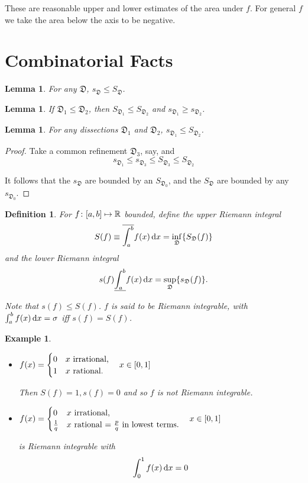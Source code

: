 \documentclass{notes}
\theoremstyle{plain}
\newtheorem{definition}[proposition]{Definition}
\newtheorem{example}[proposition]{Example}
\newtheorem{lemma}[proposition]{Lemma}
\newcommand{\dis}{\mathfrak{D}}
\begin{document}
These are reasonable upper and lower estimates of the area under $ f $.
For general $ f $ we take the area below the axis to be negative.

\section*{Combinatorial Facts}

\begin{lemma}
For any $ \dis $, $ s_{\dis}\leq S_{\dis} $.
\end{lemma}

\begin{lemma}
If $ \dis_{1}\leq \dis_{2} $, then $ S_{\dis_{1}}\leq S_{\dis_{2}} 
$ and $ s_{\dis_{1}}\geq s_{\dis_{2}} $.
\end{lemma}

\begin{lemma}
For any dissections $ \dis_{1} $ and $ \dis_{2} $, $ 
s_{\dis_{1}}\leq S_{\dis_{2}} $.
\end{lemma}
\begin{proof}
Take a common refinement $ \dis_{3} $, say, and
\[ s_{\dis_{1}}\leq s_{\dis_{3}} \leq S_{\dis_{3}} \leq S_{\dis_{2}} \]

It follows that the $ s_{\dis} $ are bounded by an $ S_{\dis_{0}} 
$, and the $ S_{\dis} $ are bounded by any $ s_{\dis_{0}} $.
\end{proof}

\begin{definition}
For $ f\colon [a,b] \mapsto \mathbb{R} $ bounded, define the upper Riemann integral
\[
S(f) \equiv \overline{\int_{a}^{b}}f(x)\,\ud x = 
\inf_{\dis}\{S_{\dis}(f)\}
\]
and the lower Riemann integral
\[
s(f) \underline{\int_{a}^{b}}f(x)\,\ud x = 
\sup_{\dis}\{s_{\dis}(f)\}.
\]

Note that $ s(f)\leq S(f) $.  $ f $ is said to be \emph{Riemann
  integrable}, with $ \int_{a}^{b}f(x)\,\mathrm{d} x = \sigma $  iff $s(f) =
  S(f)$.
\end{definition}

\begin{example}
\

\begin{itemize}
\item $ f(x)=
\begin{cases} 0& \text{$ x $ irrational,} \\ 1& 
\text{$ x $ rational.}
\end{cases} \quad  x \in [0,1] $

Then $ S(f)=1, s(f)=0 $ and so $ f $ is not Riemann integrable.

\item $ f(x)=
\begin{cases} 0& \text{$ x $ irrational,} \\ 
\frac{1}{q}& 
\text{$ x $ rational = $ \frac{p}{q} $ in lowest terms.} 
\end{cases}
\quad  x \in [0,1] $

is Riemann integrable with \[ \int_{0}^{1}f(x)\,\mathrm{d} x =0 \]
\end{itemize}
\end{example}
\end{document}
